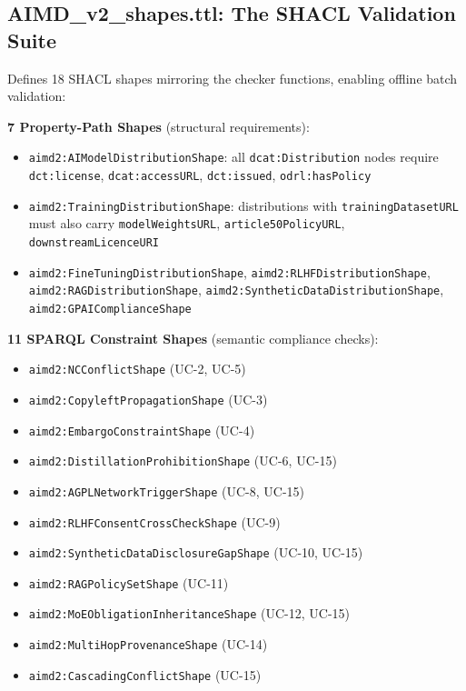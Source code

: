 \documentclass[12pt,a4paper]{article}
\begin{document}
\subsection{AIMD\_v2\_shapes.ttl: The SHACL Validation Suite}

Defines 18 SHACL shapes mirroring the checker functions, enabling offline batch validation:

\textbf{7 Property-Path Shapes} (structural requirements):

\begin{itemize}[noitemsep]
  \item \texttt{aimd2:AIModelDistributionShape}: all \texttt{dcat:Distribution} nodes require \texttt{dct:license}, \texttt{dcat:accessURL}, \texttt{dct:issued}, \texttt{odrl:hasPolicy}
  \item \texttt{aimd2:TrainingDistributionShape}: distributions with \texttt{trainingDatasetURL} must also carry \texttt{modelWeightsURL}, \texttt{article50PolicyURL}, \texttt{downstreamLicenceURI}
  \item \texttt{aimd2:FineTuningDistributionShape}, \texttt{aimd2:RLHFDistributionShape}, \texttt{aimd2:RAGDistributionShape}, \texttt{aimd2:SyntheticDataDistributionShape}, \texttt{aimd2:GPAIComplianceShape}
\end{itemize}

\textbf{11 SPARQL Constraint Shapes} (semantic compliance checks):

\begin{itemize}[noitemsep]
  \item \texttt{aimd2:NCConflictShape} (UC-2, UC-5)
  \item \texttt{aimd2:CopyleftPropagationShape} (UC-3)
  \item \texttt{aimd2:EmbargoConstraintShape} (UC-4)
  \item \texttt{aimd2:DistillationProhibitionShape} (UC-6, UC-15)
  \item \texttt{aimd2:AGPLNetworkTriggerShape} (UC-8, UC-15)
  \item \texttt{aimd2:RLHFConsentCrossCheckShape} (UC-9)
  \item \texttt{aimd2:SyntheticDataDisclosureGapShape} (UC-10, UC-15)
  \item \texttt{aimd2:RAGPolicySetShape} (UC-11)
  \item \texttt{aimd2:MoEObligationInheritanceShape} (UC-12, UC-15)
  \item \texttt{aimd2:MultiHopProvenanceShape} (UC-14)
  \item \texttt{aimd2:CascadingConflictShape} (UC-15)
\end{itemize}
\end{document}
